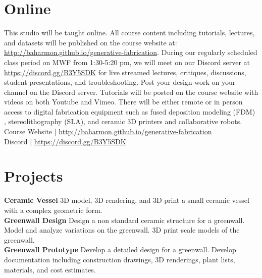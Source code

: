 \documentclass[11pt,article,oneside]{memoir}
\begin{document}
\clearpage

\section{Online}

This studio will be taught online.
All course content including tutorials, lectures, and datasets
will be published on the course website at:
\url{http://baharmon.github.io/generative-fabrication}.
During our regularly scheduled class period on MWF from 1:30-5:20 pm,
we will meet on our Discord server at \url{https://discord.gg/B3Y5SDK}
for live streamed lectures, critiques, discussions, 
student presentations, and troubleshooting. 
Post your design work on your channel on the Discord server.
Tutorials will be posted on the course website
with videos on both Youtube and Vimeo. 
There will be either remote or in person access 
to digital fabrication equipment 
such as fused deposition modeling (FDM) ,
stereolithography (SLA), and ceramic 3D printers
and collaborative robots.\\

\noindent
Course Website | \url{http://baharmon.github.io/generative-fabrication}\\
Discord | \url{https://discord.gg/B3Y5SDK}\\


\section{Projects}

\noindent \textbf{Ceramic Vessel}
3D model, 3D rendering, and 3D print 
a small ceramic vessel 
with a complex geometric form.\\

\noindent \textbf{Greenwall Design}
Design a non standard ceramic structure for a greenwall.
Model and analyze variations on the greenwall. 
3D print scale models of the greenwall.\\

\noindent \textbf{Greenwall Prototype}
Develop a detailed design for a greenwall.
Develop documentation including 
construction drawings, 3D renderings,
plant lists, materials, and cost estimates.\\
\end{document}
